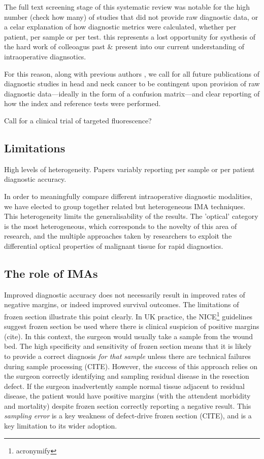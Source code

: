 The full text screening stage of this systematic review was notable for the high number (check how many) of studies that did not provide raw diagnostic data, or a celar explanation of how diagnostic metrics were calculated, whether per patient, per sample or per test.
this represents a lost opportunity for systhesis of the hard work of colleoagus past \& present into our current understanding of intraoperative diagnsotics.

For this reason, along with previous authors \cite{stjohnDiagnosticAccuracyIntraoperative2017, irwigGuidelinesMetaanalysesEvaluating1994}, we call for all future publications of diagnostic studies in head and neck cancer to be contingent upon provision of raw diagnostic data---ideally in the form of a confusion matrix---and clear reporting of how the index and reference tests were performed.

Call for a clinical trial of targeted fluorescence?

\subsection{Limitations}

High levels of heterogeneity.
Papers variably reporting per sample or per patient diagnostic accuracy.

In order to meaningfully compare different intraoperative diagnostic modalities, we have elected to group together related but heterogeneous IMA techniques. 
This heterogeneity limits the generalisability of the results.
The 'optical' category is the most heterogeneous, which corresponds to the novelty of this area of research, and the multiple approaches taken by researchers to exploit the differential optical properties of malignant tissue for rapid diagnostics.


\subsection{The role of IMAs}

Improved diagnostic accuracy does not necessarily result in improved rates of negative margins, or indeed improved survival outcomes.
The limitations of frozen section illustrate this point clearly.
In UK practice, the NICE\footnote{acronymify} guidelines suggest frozen section be used where there is clinical suspicion of positive margins (cite).
In this context, the surgeon would usually take a sample from the wound bed.
The high specificity and sensitivity of frozen section means that it is likely to provide a correct diagnosis \textit{for that sample} unless there are technical failures during sample processing (CITE).
However, the success of this approach relies on the surgeon correctly identifying and sampling residual disease in the resection defect. 
If the surgeon inadvertently sample normal tissue adjacent to residual disease, the patient would have positive margins (with the attendent morbidity and mortality) despite frozen section correctly reporting a negative result.
This \textit{sampling error} is a key weakness of defect-drive frozen section (CITE), and is a key limitation to its wider adoption.

